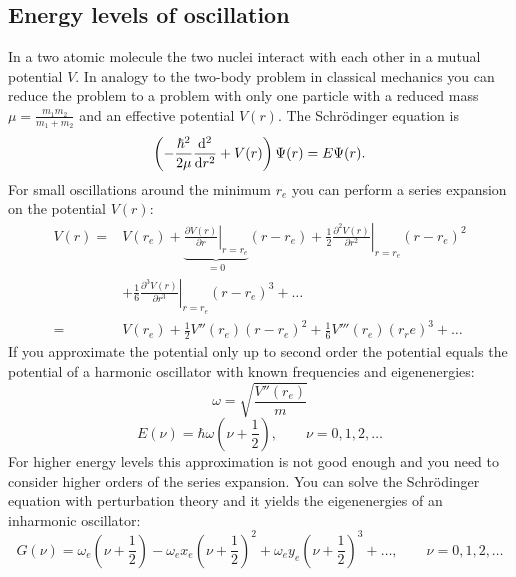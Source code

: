 \subsection{Energy levels of oscillation}
In a two atomic molecule the two nuclei interact with each other in a mutual potential $V$. In analogy to the two-body problem in classical 
mechanics you can reduce the problem to a problem with only one particle with a reduced mass $\mu = \frac{m_1 m_2}{m_1 + m_2}$ and an effective 
potential $V(r)$. The Schrödinger equation is 
\begin{equation}
\label{eq_schroedinger}
  \left( - \frac{\hbar^2}{2 \mu} \frac{\mathrm{d}^2}{\mathrm{d} r^2} + V(r) \right) \Psi(r) = E \Psi(r) .
\end{equation}
For small oscillations around the minimum $r_e$ you can perform a series expansion on the potential $V(r)$:
\begin{equation}
\begin{split}
\label{eq_potential_series}
  V(r) = &  V(r_e) + \underbrace{\left. \frac{\partial V(r)}{\partial r} \right|_{r=r_e}}_{=0} (r-r_e)
     + \left. \frac{1}{2} \frac{\partial^2 V(r)}{\partial r^2} \right|_{r=r_e}(r-r_e)^2 \\
  & + \left. \frac{1}{6} \frac{\partial^3 V(r)}{\partial r^3} \right|_{r=r_e}(r-r_e)^3 + \ldots \\
  = & V(r_e) + \frac{1}{2} V''(r_e)(r-r_e)^2 + \frac{1}{6} V'''(r_e)(r_re)^3 + \ldots
\end{split}
\end{equation}
If you approximate the potential only up to second order the potential equals the potential of a harmonic oscillator with known frequencies and 
eigenenergies:
\begin{equation}
\label{eq:ho:freq}
  \omega = \sqrt{\frac{V''(r_e)}{m}}
\end{equation}
\begin{equation}
\label{eq:ho:energy}
  E(\nu) =  \hbar \omega \left( \nu + \frac{1}{2} \right), \qquad \nu = 0, 1, 2, \ldots
\end{equation}
For higher energy levels this approximation is not good enough and you need to consider higher orders of the series expansion. You can solve the
Schrödinger equation with perturbation theory and it yields the eigenenergies of an inharmonic oscillator:
\begin{equation}
\label{eq:iho:energy}
  G(\nu) = \omega_e \left( \nu + \frac{1}{2} \right) - \omega_e x_e \left( \nu + \frac{1}{2} \right)^2 
            + \omega_e y_e \left( \nu + \frac{1}{2} \right)^3 + \ldots, \qquad \nu = 0, 1, 2, \ldots
\end{equation}
